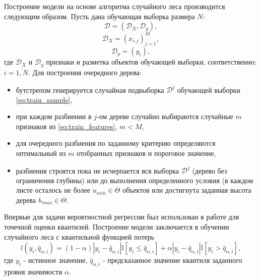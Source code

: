 \documentclass[fleqn,usenatbib]{mnras}
\begin{document}
Построение модели на основе алгоритма случайного леса производится следующим образом. Пусть дана обучающая выборка размера $N$:
\begin{equation}\label{eq:train_sample}
    \mathcal{D} = (\mathcal{D}_X, \mathcal{D}_y),
\end{equation}
\begin{equation}\label{eq:train_features}
    \mathcal{D}_X = (x_{i,j})_{j=1}^M,
\end{equation}
\begin{equation}\label{eq:train_target}
    \mathcal{D}_y = (y_i),
\end{equation}
где $\mathcal{D}_X$ и $\mathcal{D}_y$ признаки и разметка объектов обучающей выборки, соответственно; $i=\overline{1, N}$. Для построения очередного дерева:
\begin{itemize}
    \item бутстрепом генерируется случайная подвыборка $\mathcal{D}^j$ обучающей выборки \eqref{eq:train_sample},
    \item при каждом разбиении в $j$-ом дереве случайно выбираются случайные $m$ признаков из \eqref{eq:train_features}, $m < M$,
    \item для очередного разбиения по заданному критерию определяются оптимальный из $m$ отобранных признаков и пороговое значение,
    \item разбиения строятся пока не исчерпается вся выборка $\mathcal{D}^j$ (дерево без ограничения глубины) или до выполнения определенного условия (в каждом листе осталось не более $n_{min} \in \Theta$ объектов или достигнута заданная высота дерева $h_{max} \in \Theta$.
\end{itemize}

Впервые для задачи вероятностной регрессии был использован в работе \cite{JMLR:v7:meinshausen06a} для точечной оценки квантилей. Построение модели заключается в обучении случайного леса с квантильной функцией потерь 
\begin{equation}\label{eq:quantile_loss}
    l(y_i, \hat{q}_{\alpha, i}) = (1-\alpha)|y_i - \hat{q}_{\alpha, i}|\mathbb{I}[y_i \leq \hat{q}_{\alpha, i}] + \alpha|y_i - \hat{q}_{\alpha, i}|\mathbb{I}[y_i > \hat{q}_{\alpha, i}],
\end{equation}
где $y_i$ - истинное значение, $\hat{q}_{\alpha, i}$ - предсказанное значение квантиля заданного уровня значимости $\alpha$.
\end{document}
